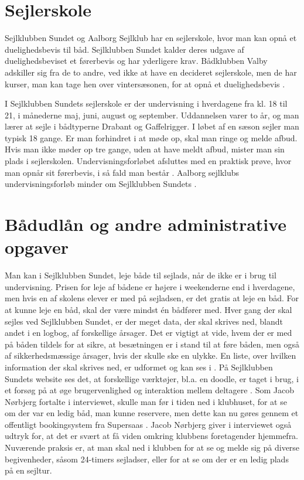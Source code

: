 \section{Sejlerskole}\label{sec:sejlerskole}

Sejlklubben Sundet og Aalborg Sejlklub har en sejlerskole, hvor man kan opnå et duelighedsbevis til båd.
Sejlklubben Sundet kalder deres udgave af duelighedsbeviset et førerbevis og har yderligere krav.
Bådklubben Valby adskiller sig fra de to andre, ved ikke at have en decideret sejlerskole, men de har kurser, man kan tage hen over vintersæsonen, for at opnå et duelighedsbevis \citep{baedklubben_valby_duelighedsbevis}.

I Sejlklubben Sundets sejlerskole er der undervisning i hverdagene fra kl. 18 til 21, i månederne maj, juni, august og september. 
Uddannelsen varer to år, og man lærer at sejle i bådtyperne Drabant og Gaffelrigger. 
I løbet af en sæson sejler man typisk 18 gange. 
Er man forhindret i at møde op, skal man ringe og melde afbud.
Hvis man ikke møder op tre gange, uden at have meldt afbud, mister man sin plads i sejlerskolen.
Undervisningsforløbet afsluttes med en praktisk prøve, hvor man opnår sit førerbevis, i så fald man består \citep{Sundet}.
Aalborg sejlklubs undervisningsforløb minder om Sejlklubben Sundets \citep{aalborg_sejlklub_sejlerskole}.


\section{Bådudlån og andre administrative opgaver}\label{subsec:bådudlån}

Man kan i Sejlklubben Sundet, leje både til sejlads, når de ikke er i brug til undervisning. 
Prisen for leje af bådene er højere i weekenderne end i hverdagene, men hvis en af skolens elever er med på sejladsen, er det gratis at leje en båd. 
For at kunne leje en båd, skal der være mindst én bådfører med.
Hver gang der skal sejles ved Sejlklubben Sundet, er der meget data, der skal skrives ned, blandt andet i en logbog, af forskellige årsager.
Det er vigtigt at vide, hvem der er med på båden tildels for at sikre, at besætningen er i stand til at føre båden, men også af sikkerhedsmæssige årsager, hvis der skulle ske en ulykke. 
En liste, over hvilken information der skal skrives ned, er udformet og kan ses i . 
På Sejlklubben Sundets website ses det, at forskellige værktøjer, bl.a. en doodle, er taget i brug, i et forsøg på at øge brugervenlighed og interaktion mellem deltagere \citep{SundetUdlaan}. 
Som Jacob Nørbjerg fortalte i interviewet, skulle man før i tiden ned i klubhuset, for at se om der var en ledig båd, man kunne reservere, men dette kan nu gøres gennem et offentligt bookingsystem fra Supersaas \citep{Booking}.
Jacob Nørbjerg giver i interviewet også udtryk for, at det er svært at få viden omkring klubbens foretagender hjemmefra. 
Nuværende praksis er, at man skal ned i klubben for at se og melde sig på diverse begivenheder, såsom 24-timers sejladser, eller for at se om der er en ledig plads på en sejltur.

